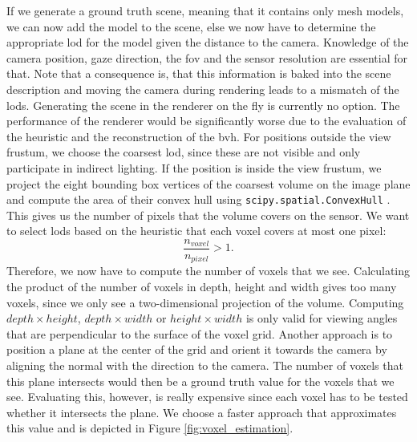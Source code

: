 If we generate a ground truth scene, meaning that it contains only mesh models, we can now add the model to the scene, else we now have to determine the appropriate \ac{lod} for the model given the distance to the camera.
Knowledge of the camera position, gaze direction, the \ac{fov} and the sensor resolution are essential for that.
Note that a consequence is, that this information is baked into the scene description and moving the camera during rendering leads to a mismatch of the \acp{lod}.
Generating the scene in the renderer on the fly is currently no option.
The performance of the renderer would be significantly worse due to the evaluation of the heuristic and the reconstruction of the \ac{bvh}.
For positions outside the view frustum, we choose the coarsest \ac{lod}, since these are not visible and only participate in indirect lighting.
If the position is inside the view frustum, we project the eight bounding box vertices of the coarsest volume on the image plane and compute the area of their convex hull using \texttt{scipy.spatial.ConvexHull} \cite{scipy}.
This gives us the number of pixels that the volume covers on the sensor.
We want to select \acp{lod} based on the heuristic that each voxel covers at most one pixel:
\begin{equation*}
    \frac{n_{voxel}}{n_{pixel}} > 1.
\end{equation*}
Therefore, we now have to compute the number of voxels that we see.
Calculating the product of the number of voxels in depth, height and width gives too many voxels, since we only see a two-dimensional projection of the volume.
Computing $depth \times height$, $depth \times width$ or $height \times width$ is only valid for viewing angles that are perpendicular to the surface of the voxel grid.
Another approach is to position a plane at the center of the grid and orient it towards the camera by aligning the normal with the direction to the camera.
The number of voxels that this plane intersects would then be a ground truth value for the voxels that we see.
Evaluating this, however, is really expensive since each voxel has to be tested whether it intersects the plane.
We choose a faster approach that approximates this value and is depicted in Figure \ref{fig:voxel_estimation}.
